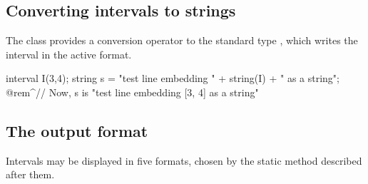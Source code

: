 \documentclass[12pt,a4paper,twoside,openright]{book}
\begin{document}
\subsection{Converting intervals to strings}

The class  provides a conversion operator to the standard
type , which writes the interval in the active format.
%

\begin{example}
  interval I(3,4);
  string s = "test line embedding " + string(I) + " as a string";
  @rem^// Now, s is "test line embedding [3, 4] as a string"~
\end{example}

\subsection{The output format}\label{sec:output-format}

Intervals may be displayed in five formats, chosen by the static method
 described after them.
%
%
\end{document}

